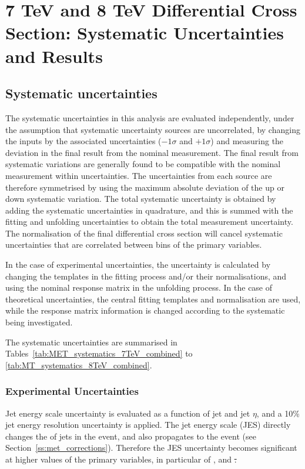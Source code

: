 \chapter{7 TeV and 8 TeV Differential Cross Section: Systematic Uncertainties and Results}
\label{c:Differential_Cross_Section:systematics_and_results}

\section{Systematic uncertainties}
\label{s:systematic_uncertainties}
The systematic uncertainties in this analysis are evaluated independently, under the assumption that
systematic uncertainty sources are uncorrelated, by changing the inputs by the associated uncertainties
($-1\sigma$ and $+1\sigma$) and measuring the deviation in the final result from the nominal measurement. The
final result from systematic variations are generally found to be compatible with the nominal measurement within uncertainties. The
uncertainties from each source are therefore symmetrised by using the maximum absolute deviation of the up or
down systematic variation. The total systematic uncertainty is obtained by adding the systematic uncertainties
in quadrature, and this is summed with the fitting and unfolding uncertainties to obtain the total measurement
uncertainty. The normalisation of the final differential cross section will cancel systematic uncertainties
that are correlated between bins of the primary variables.

In the case of experimental uncertainties, the uncertainty is calculated by changing the templates in the
fitting process and/or their normalisations, and using the nominal \MADGRAPH response matrix in the unfolding
process. In the case of theoretical uncertainties, the central fitting templates and normalisation are used,
while the response matrix information is changed according to the systematic being investigated.

The systematic uncertainties are summarised in Tables~\ref{tab:MET_systematics_7TeV_combined} to
\ref{tab:MT_systematics_8TeV_combined}.

\subsection{Experimental Uncertainties}
\label{ss:experimental_uncertainties}

Jet energy scale uncertainty is evaluated as a function of jet \pt and jet $\eta$, and a 10\% jet energy
resolution uncertainty is applied. The jet energy scale (JES) directly changes the \pt of jets in
the event, and also propagates to the event \met (see
Section~\ref{ss:met_corrections}). Therefore the JES uncertainty becomes significant at higher
values of the primary variables, in particular of \met, \HT and \st.

